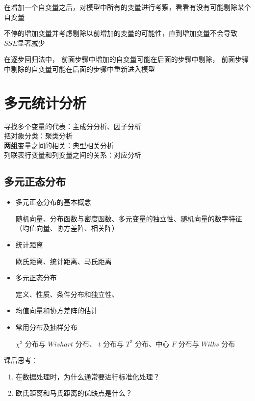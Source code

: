 \documentclass[UTF8,10pt]{book}
\begin{document}
在增加一个自变量之后，对模型中所有的变量进行考察，看看有没有可能剔除某个自变量 

不停的增加变量并考虑剔除以前增加的变量的可能性，直到增加变量不会导致 $SSE$显著减少 

在逐步回归法中， 前面步骤中增加的自变量可能在后面的步骤中剔除， 前面步骤中剔除的自变量可能在后面的步骤中重新进入模型

\clearpage
\chapter{多元统计分析}

寻找多个变量的代表：主成分分析、因子分析\\

把对象分类：聚类分析\\

\textbf{两组}变量之间的相关：典型相关分析\\

列联表行变量和列变量之间的关系：对应分析

\section{多元正态分布}\label{header-n2}

\begin{itemize}
	\item
	多元正态分布的基本概念
	
	随机向量、分布函数与密度函数、多元变量的独立性、随机向量的数字特征（均值向量、协方差阵、相关阵）
	\item
	统计距离
	
	欧氏距离、统计距离、马氏距离
	\item
	多元正态分布
	
	定义、性质、条件分布和独立性、
	\item
	均值向量和协方差阵的估计
	\item
	常用分布及抽样分布
	
	\(\chi^2\) 分布与 \(Wishart\) 分布、 \(t\) 分布与 \(T^2\) 分布、中心
	\(F\) 分布与 \(Wilks\) 分布
\end{itemize}

课后思考：

\begin{enumerate}
	\def\labelenumi{\arabic{enumi}.}
	\item
	在数据处理时，为什么通常要进行标准化处理？
	\item
	欧氏距离和马氏距离的优缺点是什么？
\end{enumerate}
\end{document}
